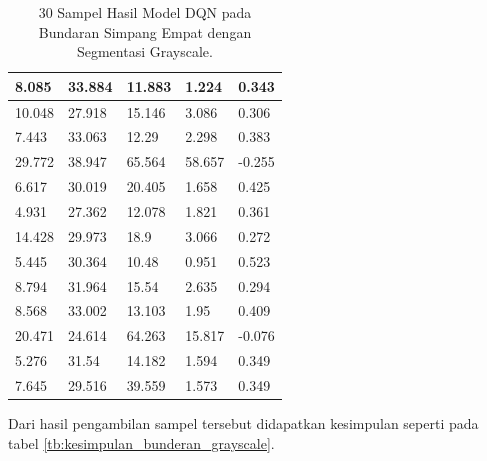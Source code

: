 \documentclass[conference]{IEEEtran}
\begin{document}
\begin{table}[H]
{\begin{tabular}{|l|l|l|l|l|}
				8.085           & 33.884     & 11.883           & 1.224           & 0.343       \\ \hline
				10.048          & 27.918     & 15.146           & 3.086           & 0.306       \\ \hline
				7.443           & 33.063     & 12.29            & 2.298           & 0.383       \\ \hline
				29.772          & 38.947     & 65.564           & 58.657          & -0.255      \\ \hline
				6.617           & 30.019     & 20.405           & 1.658           & 0.425       \\ \hline
				4.931           & 27.362     & 12.078           & 1.821           & 0.361       \\ \hline
				14.428          & 29.973     & 18.9             & 3.066           & 0.272       \\ \hline
				5.445           & 30.364     & 10.48            & 0.951           & 0.523       \\ \hline
				8.794           & 31.964     & 15.54            & 2.635           & 0.294       \\ \hline
				8.568           & 33.002     & 13.103           & 1.95            & 0.409       \\ \hline
				20.471          & 24.614     & 64.263           & 15.817          & -0.076      \\ \hline
				5.276           & 31.54      & 14.182           & 1.594           & 0.349       \\ \hline
				7.645           & 29.516     & 39.559           & 1.573           & 0.349       \\ \hline
			\end{tabular}%
		}
		\caption{30 Sampel Hasil Model DQN pada Bundaran Simpang Empat dengan Segmentasi Grayscale.}
		\label{tb:hasilpengujian_bunderan_grayscale}
	\end{table}
	
	Dari hasil pengambilan sampel tersebut didapatkan kesimpulan seperti pada tabel \ref{tb:kesimpulan_bunderan_grayscale}.
	
	\begin{table}[H]
		\caption{Kesimpulan Hasil Model DQN pada Bundaran Simpang Empat dengan Segmentasi Grayscale.}
		\label{tb:kesimpulan_bunderan_grayscale}
	\end{table}
	
\end{document}
